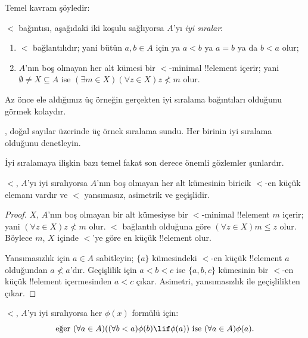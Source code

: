 


Temel kavram şöyledir:

\begin{defn}
$<$ bağıntısı, aşağıdaki iki koşulu sağlıyorsa $A$'yı \emph{iyi sıralar}:
\begin{enumerate}
	\item $<$ bağlantılıdır; yani bütün $a,b\in A$ için ya $a<b$ ya $a=b$
	ya da $b<a$ olur;
	\item $A$'nın boş olmayan her alt kümesi bir $<$-minimal
	!!{element} içerir; yani $\emptyset\neq X\subseteq A$ ise
	$(\exists m\in X)(\forall z\in X)z\nless m$ olur.
\end{enumerate}
\end{defn}

Az önce ele aldığımız üç örneğin gerçekten iyi sıralama bağıntıları olduğunu
görmek kolaydır.

\begin{prob}
, doğal sayılar üzerinde üç örnek sıralama
sundu. Her birinin iyi sıralama olduğunu denetleyin.
\end{prob}

İyi sıralamaya ilişkin bazı temel fakat son derece önemli gözlemler şunlardır.

\begin{prop}
$<$, $A$'yı iyi sıralıyorsa $A$'nın boş olmayan her alt kümesinin biricik
$<$-en küçük elemanı vardır ve $<$ yansımasız, asimetrik ve geçişlidir.
\end{prop}

\begin{proof}
$X$, $A$'nın boş olmayan bir alt kümesiyse bir $<$-minimal !!{element}
$m$ içerir; yani $(\forall z\in X)z\nless m$ olur. $<$ bağlantılı olduğuna
göre $(\forall z\in X)m\leq z$ olur. Böylece $m$, $X$ içinde $<$'ye göre
en küçük !!{element} olur.

Yansımasızlık için $a\in A$ sabitleyin; $\{a\}$ kümesindeki $<$-en küçük
!!{element} $a$ olduğundan $a\nless a$'dır. Geçişlilik için $a<b<c$ ise
$\{a,b,c\}$ kümesinin bir $<$-en küçük !!{element} içermesinden $a<c$
çıkar. Asimetri, yansımasızlık ile geçişlilikten çıkar.
\end{proof}

\begin{prop}
$<$, $A$'yı iyi sıralıyorsa her $\phi(x)$ formülü için:
\[
	\text{eğer }(\forall a \in A)((\forall b < a)\phi(b) \lif
		\phi(a))\text{ ise }(\forall a \in A)\phi(a).
\]
\end{prop}

